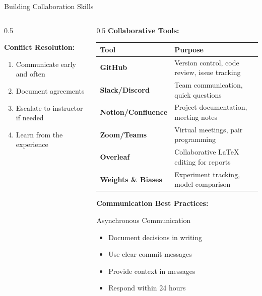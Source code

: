 \begin{frame}{Building Collaboration Skills}
\begin{columns}
\begin{column}{0.5\textwidth}
\vspace{0.3cm}

\textbf{Conflict Resolution:}
\begin{enumerate}
\item Communicate early and often
\item Document agreements
\item Escalate to instructor if needed
\item Learn from the experience
\end{enumerate}
\end{column}

\begin{column}{0.5\textwidth}
\textbf{Collaborative Tools:}

\begin{table}
\small
\begin{tabular}{|l|p{4cm}|}
\hline
\rowcolor{navyblue!20}
\textbf{Tool} & \textbf{Purpose} \\
\hline
\textbf{GitHub} & Version control, code review, issue tracking \\
\hline
\textbf{Slack/Discord} & Team communication, quick questions \\
\hline
\textbf{Notion/Confluence} & Project documentation, meeting notes \\
\hline
\textbf{Zoom/Teams} & Virtual meetings, pair programming \\
\hline
\textbf{Overleaf} & Collaborative LaTeX editing for reports \\
\hline
\textbf{Weights \& Biases} & Experiment tracking, model comparison \\
\hline
\end{tabular}
\end{table}

\vspace{0.3cm}

\textbf{Communication Best Practices:}

\begin{block}{Asynchronous Communication}
\begin{itemize}
\item Document decisions in writing
\item Use clear commit messages
\item Provide context in messages
\item Respond within 24 hours
\end{itemize}
\end{block}


\end{column}
\end{columns}
\end{frame}
